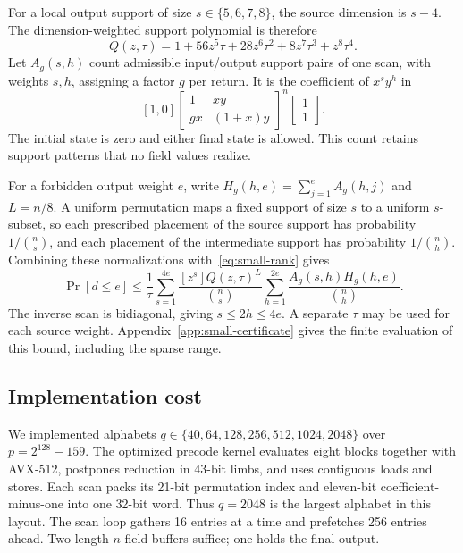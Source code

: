 For a local output support of size $s\in\{5,6,7,8\}$, the source
dimension is $s-4$. The dimension-weighted support polynomial is therefore
\begin{equation}\label{eq:small-source}
 Q(z,\tau)=1+56z^5\tau+28z^6\tau^2+8z^7\tau^3+z^8\tau^4.
\end{equation}
Let $A_g(s,h)$ count admissible input/output support pairs of one scan,
with weights $s,h$, assigning a factor $g$ per return. It is the
coefficient of $x^s y^h$ in
\begin{equation}\label{eq:small-transfer}
 [1,0]\begin{bmatrix}1&xy\\gx&(1+x)y\end{bmatrix}^{n}
 \begin{bmatrix}1\\1\end{bmatrix}.
\end{equation}
The initial state is zero and either final state is allowed. This count
retains support patterns that no field values realize.

For a forbidden output weight $e$, write
$H_g(h,e)=\sum_{j=1}^e A_g(h,j)$ and $L=n/8$.
A uniform permutation maps a fixed support of size $s$ to a uniform
$s$-subset, so each prescribed placement of the source support has
probability $1/\binom ns$, and each placement of the intermediate support
has probability $1/\binom nh$. Combining these normalizations
with~\eqref{eq:small-rank} gives
\begin{equation}\label{eq:small-union}
 \Pr[d\le e]\le\frac1\tau\sum_{s=1}^{4e}
 \frac{[z^s]Q(z,\tau)^L}{\binom ns}
 \sum_{h=1}^{2e}\frac{A_g(s,h)H_g(h,e)}{\binom nh}.
\end{equation}
The inverse scan is bidiagonal, giving $s\le2h\le4e$. A separate $\tau$
may be used for each source weight. Appendix~\ref{app:small-certificate}
gives the finite evaluation of this bound, including the sparse range.

\subsection{Implementation cost}

We implemented alphabets $q\in\{40,64,128,256,512,1024,2048\}$ over
$p=2^{128}-159$. The optimized precode
kernel evaluates eight blocks together with AVX-512, postpones reduction
in 43-bit limbs, and uses contiguous loads and stores. Each scan packs
its 21-bit permutation index and eleven-bit coefficient-minus-one into
one 32-bit word. Thus $q=2048$ is the largest alphabet in this layout.
The scan loop gathers 16 entries at a time and prefetches 256 entries
ahead. Two length-$n$ field buffers suffice; one holds the final output.

